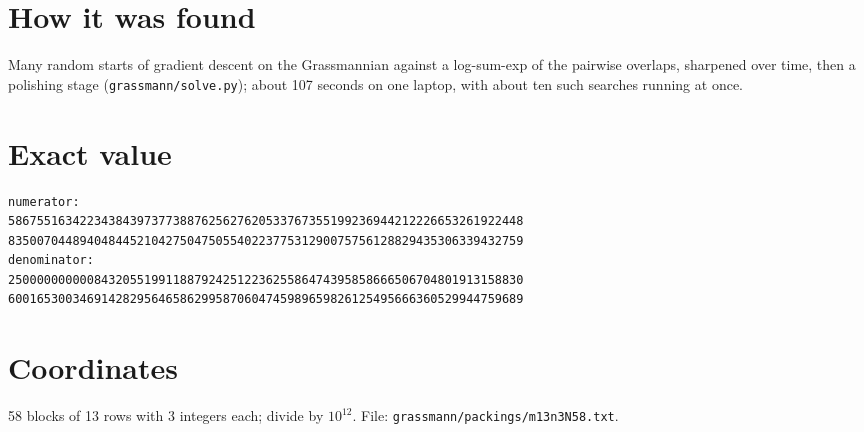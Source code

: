 \documentclass[11pt,a4paper]{article}
\begin{document}
\section{How it was found}
Many random starts of gradient descent on the Grassmannian against a log-sum-exp of the pairwise overlaps, sharpened over time, then a polishing stage (\texttt{grassmann/solve.py}); about 107 seconds on one laptop, with about ten such searches running at once.


\appendix
\section{Exact value}
{\small
\begin{verbatim}
numerator:
586755163422343843973773887625627620533767355199236944212226653261922448
835007044894048445210427504750554022377531290075756128829435306339432759
denominator:
250000000000843205519911887924251223625586474395858666506704801913158830
600165300346914282956465862995870604745989659826125495666360529944759689
\end{verbatim}}

\section{Coordinates}
58 blocks of 13 rows with 3 integers each; divide by $10^{12}$. File: \texttt{grassmann/packings/m13n3N58.txt}.
{\tiny
\begin{multicols}{3}
\end{multicols}}
\end{document}
